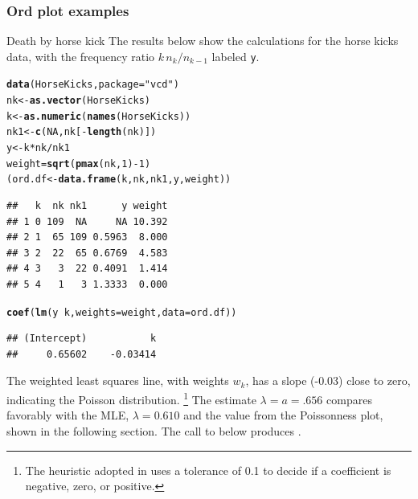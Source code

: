 \documentclass[11pt]{book}\usepackage[]{graphicx}\usepackage[]{color}
\makeatletter
\newcommand{\hlnum}[1]{\textcolor[rgb]{0.686,0.059,0.569}{#1}}%
\newcommand{\hlstr}[1]{\textcolor[rgb]{0.192,0.494,0.8}{#1}}%
\newcommand{\hlopt}[1]{\textcolor[rgb]{0,0,0}{#1}}%
\newcommand{\hlstd}[1]{\textcolor[rgb]{0.345,0.345,0.345}{#1}}%
\newcommand{\hlkwb}[1]{\textcolor[rgb]{0.69,0.353,0.396}{#1}}%
\newcommand{\hlkwc}[1]{\textcolor[rgb]{0.333,0.667,0.333}{#1}}%
\newcommand{\hlkwd}[1]{\textcolor[rgb]{0.737,0.353,0.396}{\textbf{#1}}}%
\newenvironment{kframe}{%
 \def\at@end@of@kframe{}%
 \ifinner\ifhmode%
  \def\at@end@of@kframe{\end{minipage}}%
  \begin{minipage}{\columnwidth}%
 \fi\fi%
 \def\FrameCommand##1{\hskip\@totalleftmargin \hskip-\fboxsep
 \colorbox{shadecolor}{##1}\hskip-\fboxsep
     \hskip-\linewidth \hskip-\@totalleftmargin \hskip\columnwidth}%
 \MakeFramed {\advance\hsize-\width
   \@totalleftmargin\z@ \linewidth\hsize
   \@setminipage}}%
 {\par\unskip\endMakeFramed%
 \at@end@of@kframe}
\newenvironment{knitrout}{}{} %
\renewenvironment{knitrout}{\small\renewcommand{\baselinestretch}{.85}}{} %
\makeatother
\begin{document}
\subsubsection{Ord plot examples}
\begin{Example}[horskick3]{Death by horse kick}
The results below show the calculations for
the horse kicks data, with the frequency ratio \({ k \,  n_k } /  { n_{k-1}
}\) labeled \texttt{y}.  

\begin{knitrout}
\color{fgcolor}\begin{kframe}
\begin{alltt}
\hlkwd{data}\hlstd{(HorseKicks,} \hlkwc{package}\hlstd{=}\hlstr{"vcd"}\hlstd{)}
\hlstd{nk} \hlkwb{<-} \hlkwd{as.vector}\hlstd{(HorseKicks)}
\hlstd{k} \hlkwb{<-} \hlkwd{as.numeric}\hlstd{(}\hlkwd{names}\hlstd{(HorseKicks))}
\hlstd{nk1} \hlkwb{<-} \hlkwd{c}\hlstd{(}\hlnum{NA}\hlstd{, nk[}\hlopt{-}\hlkwd{length}\hlstd{(nk)])}
\hlstd{y} \hlkwb{<-} \hlstd{k} \hlopt{*} \hlstd{nk}\hlopt{/}\hlstd{nk1}
\hlstd{weight} \hlkwb{=} \hlkwd{sqrt}\hlstd{(}\hlkwd{pmax}\hlstd{(nk,} \hlnum{1}\hlstd{)} \hlopt{-} \hlnum{1}\hlstd{)}
\hlstd{(ord.df} \hlkwb{<-} \hlkwd{data.frame}\hlstd{(k, nk, nk1, y, weight))}
\end{alltt}
\begin{verbatim}
##   k  nk nk1      y weight
## 1 0 109  NA     NA 10.392
## 2 1  65 109 0.5963  8.000
## 3 2  22  65 0.6769  4.583
## 4 3   3  22 0.4091  1.414
## 5 4   1   3 1.3333  0.000
\end{verbatim}
\begin{alltt}
\hlkwd{coef}\hlstd{(}\hlkwd{lm}\hlstd{(y} \hlopt{~} \hlstd{k,} \hlkwc{weights}\hlstd{=weight,} \hlkwc{data}\hlstd{=ord.df))}
\end{alltt}
\begin{verbatim}
## (Intercept)           k 
##     0.65602    -0.03414
\end{verbatim}
\end{kframe}
\end{knitrout}


The weighted least squares line, with weights
\(w_k\), has a slope (-0.03) close to zero, indicating the Poisson
distribution.%
\footnote{
The heuristic adopted in  uses a tolerance of 0.1
to decide if a coefficient is negative, zero, or positive.
}
The estimate \(\lambda = a = .656\) compares
favorably with the MLE, $\lambda=0.610$ and the
value from the Poissonness plot, shown in the
following section.  The call to  below
produces .


\end{Example}
\end{document}
